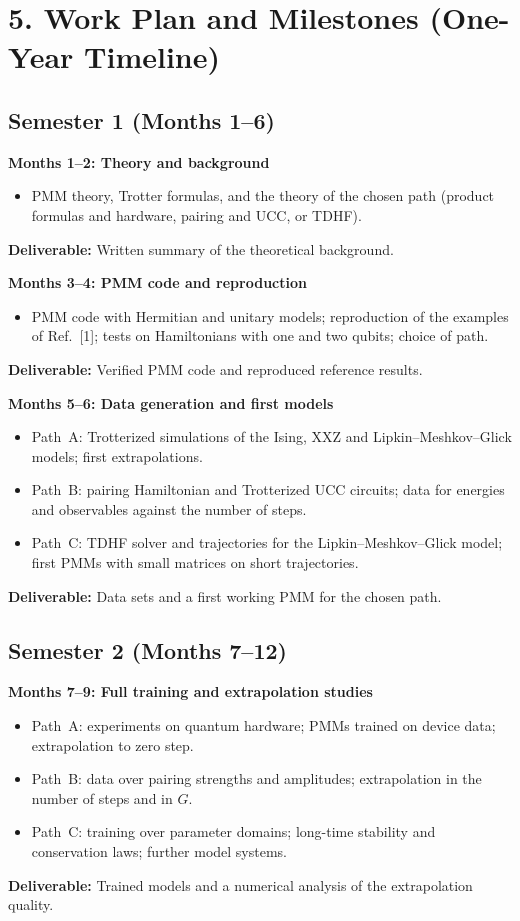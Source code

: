 \documentclass[12pt,a4paper]{article}
\begin{document}
\section*{5. Work Plan and Milestones (One-Year Timeline)}

\subsection*{Semester 1 (Months 1--6)}

\textbf{Months 1--2: Theory and background}
\begin{itemize}
    \item PMM theory, Trotter formulas, and the theory of the chosen
    path (product formulas and hardware, pairing and UCC, or TDHF).
\end{itemize}
\textbf{Deliverable:} Written summary of the theoretical background.

\bigskip

\textbf{Months 3--4: PMM code and reproduction}
\begin{itemize}
    \item PMM code with Hermitian and unitary models; reproduction of
    the examples of Ref.~[1]; tests on Hamiltonians with one and two
    qubits; choice of path.
\end{itemize}
\textbf{Deliverable:} Verified PMM code and reproduced reference
results.

\bigskip

\textbf{Months 5--6: Data generation and first models}
\begin{itemize}
    \item Path~A: Trotterized simulations of the Ising, XXZ and
    Lipkin--Meshkov--Glick models; first extrapolations.
    \item Path~B: pairing Hamiltonian and Trotterized UCC circuits;
    data for energies and observables against the number of steps.
    \item Path~C: TDHF solver and trajectories for the
    Lipkin--Meshkov--Glick model; first PMMs with small matrices on
    short trajectories.
\end{itemize}
\textbf{Deliverable:} Data sets and a first working PMM for the chosen
path.

\subsection*{Semester 2 (Months 7--12)}

\textbf{Months 7--9: Full training and extrapolation studies}
\begin{itemize}
    \item Path~A: experiments on quantum hardware; PMMs trained on
    device data; extrapolation to zero step.
    \item Path~B: data over pairing strengths and amplitudes;
    extrapolation in the number of steps and in $G$.
    \item Path~C: training over parameter domains; long-time stability
    and conservation laws; further model systems.
\end{itemize}
\textbf{Deliverable:} Trained models and a numerical analysis of the
extrapolation quality.
\end{document}
